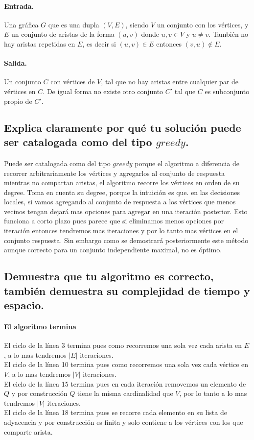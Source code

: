 \documentclass[12pt]{article}
\begin{document}
\paragraph{Entrada.}Una gráfica $G$ que es una dupla $(V, E)$, siendo $V$ un conjunto con los vértices, y $E$ un conjunto de aristas de la forma $(u, v)$ donde $u, v\in V$ y $u \neq v$. También no hay aristas repetidas en $E$, es decir si $(u, v) \in E$ entonces $(v, u) \notin E$.
\paragraph{Salida.} Un conjunto $C$ con vértices de $V$, tal que no hay aristas entre cualquier par de vértices en $C$. De igual forma no existe otro conjunto $C'$ tal que $C$ es subconjunto propio de $C'$.
\subsection{Explica claramente por qué tu solución puede ser catalogada como del tipo $greedy$.}
\paragraph{}Puede ser catalogada como del tipo $greedy$ porque el algoritmo a diferencia de recorrer arbitrariamente los vértices y agregarlos al conjunto de respuesta mientras no compartan aristas, el algoritmo recorre los vértices en orden de su degree. Toma en cuenta su degree, porque la intuición es que. en las decisiones locales, si vamos agregando al conjunto de respuesta a los vértices que menos vecinos tengan dejará mas opciones para agregar en una iteración posterior. Esto funciona a corto plazo pues parece que si eliminamos menos opciones por iteración entonces tendremos mas iteraciones y por lo tanto mas vértices en el conjunto respuesta. Sin embargo como se demostrará posteriormente este método aunque correcto para un conjunto independiente maximal, no es óptimo.\\
\subsection{Demuestra que tu algoritmo es correcto, también demuestra su complejidad de tiempo y espacio.}
\paragraph{El algoritmo termina}
El ciclo de la línea 3 termina pues como recorremos una sola vez cada arista en $E$, a lo mas tendremos $|E|$ iteraciones.\\
El ciclo de la línea 10 termina pues como recorremos una sola vez cada vértice en $V$, a lo mas tendremos $|V|$ iteraciones.\\
El ciclo de la línea 15 termina pues en cada iteración removemos un elemento de $Q$ y por construcción $Q$ tiene la misma cardinalidad que $V$, por lo tanto a lo mas tendremos $|V|$ iteraciones.\\
El ciclo de la línea 18 termina pues se recorre cada elemento en su lista de adyacencia y por construcción es finita y solo contiene a los vértices con los que comparte arista.\\
\end{document}
